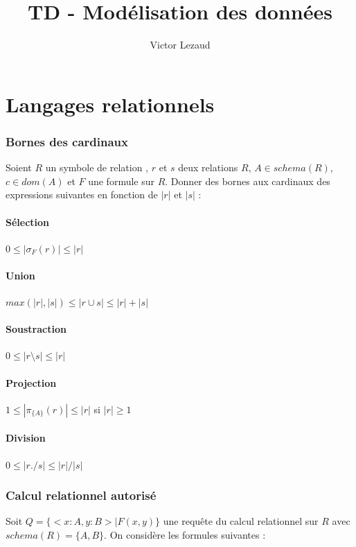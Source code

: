 \documentclass[10pt,a4paper,twoside]{article}
\author{Victor Lezaud}
\title{TD - Modélisation des données}
\begin{document}
\renewcommand{\partname}{Séance de Travaux Dirigés}
\renewcommand{\contentsname}{Sommaire}

\maketitle
\setcounter{tocdepth}{1}
\tableofcontents

\newpage

\part{Langages relationnels}
\section{Bornes des cardinaux}
Soient $R$ un symbole de relation , $r$ et $s$ deux relations $R$, $A \in schema(R)$, $c \in dom(A)$ et $F$ une formule sur $R$. Donner des bornes aux cardinaux des expressions suivantes en fonction de $|r|$ et $|s|$ :

\subsection{Sélection}
$0 \leq |\sigma_{F}(r)| \leq |r|$
\subsection{Union}
$max(|r|,|s|) \leq |r \cup s| \leq |r| + |s|$
\subsection{Soustraction}
$0 \leq |r \setminus s| \leq |r|$
\subsection{Projection}
$1 \leq |\pi_{\{A\}}(r)| \leq |r|$ si $|r| \geq 1$
\subsection{Division}
$0 \leq |r ./ s| \leq |r|/|s|$

\section{Calcul relationnel autorisé}
Soit $Q = \{<x:A, y:B> \mid F(x,y)\}$ une requête du calcul relationnel sur $R$ avec $schema(R) = \{A,B\}$. On considère les formules suivantes :
\end{document}
